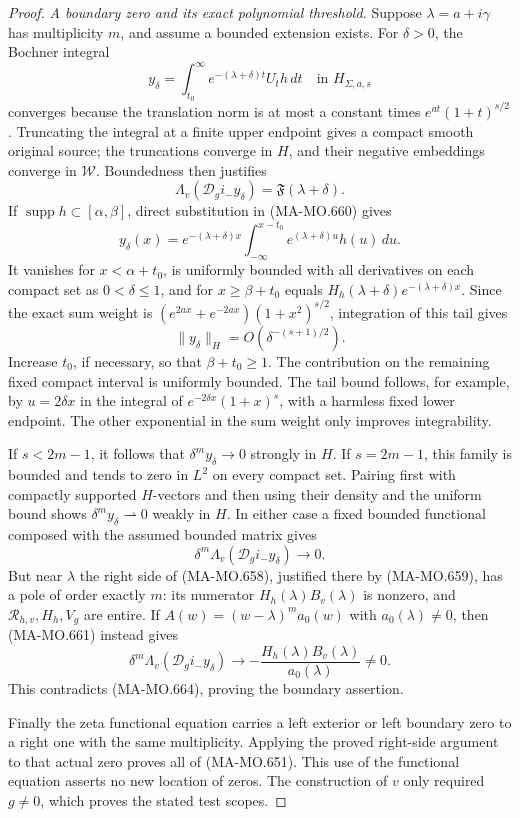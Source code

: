 \begin{proof}
\emph{A boundary zero and its exact polynomial threshold.}
Suppose \(\lambda=a+i\gamma\) has multiplicity \(m\), and
assume a bounded extension exists. For \(\delta>0\), the
Bochner integral
\[
 y_\delta=\int_{t_0}^{\infty}
                   e^{-(\lambda+\delta)t}U_th\,dt
                    \quad\text{in }H_{\Sigma,a,s}
 \tag{MA-MO.660}
\]
converges because the translation norm is at most a constant
times \(e^{at}(1+t)^{s/2}\). Truncating the integral at a
finite upper endpoint gives a compact smooth original source;
the truncations converge in \(H\), and their negative embeddings
converge in \(\mathcal W\). Boundedness then justifies
\[
 \Lambda_v(\mathscr D_g i_-y_\delta)
                        =\mathfrak F(\lambda+\delta).
 \tag{MA-MO.661}
\]
If \(\operatorname{supp}h\subset[\alpha,\beta]\), direct
substitution in (MA-MO.660) gives
\[
 y_\delta(x)=e^{-(\lambda+\delta)x}
       \int_{-\infty}^{x-t_0}e^{(\lambda+\delta)u}h(u)\,du.
 \tag{MA-MO.662}
\]
It vanishes for \(x<\alpha+t_0\), is uniformly bounded with
all derivatives on each compact set as \(0<\delta\leq1\),
and for \(x\geq\beta+t_0\) equals
\(H_h(\lambda+\delta)e^{-(\lambda+\delta)x}\).
Since the exact sum weight is
\((e^{2ax}+e^{-2ax})(1+x^2)^{s/2}\), integration of this
tail gives
\[
                  \|y_\delta\|_H
                         =O(\delta^{-(s+1)/2}).
 \tag{MA-MO.663}
\]
Increase \(t_0\), if necessary, so that \(\beta+t_0\geq1\).
The contribution on the remaining fixed compact interval is
uniformly bounded. The tail bound follows, for example, by
\(u=2\delta x\) in the integral of
\(e^{-2\delta x}(1+x)^s\), with a harmless fixed lower
endpoint. The other exponential in the sum weight only improves
integrability.

If \(s<2m-1\), it follows that \(\delta^m y_\delta\to0\)
strongly in \(H\). If \(s=2m-1\), this family is bounded
and tends to zero in \(L^2\) on every compact set. Pairing
first with compactly supported \(H\)-vectors and then using
their density and the uniform bound shows
\(\delta^m y_\delta\rightharpoonup0\) weakly in \(H\).
In either case a fixed bounded functional composed with the
assumed bounded matrix gives
\[
       \delta^m\Lambda_v(\mathscr D_g i_-y_\delta)\longrightarrow0.
 \tag{MA-MO.664}
\]
But near \(\lambda\) the right side of (MA-MO.658), justified
there by (MA-MO.659), has a pole of order exactly \(m\): its
numerator \(H_h(\lambda)B_v(\lambda)\) is nonzero, and
\(\mathcal R_{h,v},H_h,V_g\) are entire. If
\(A(w)=(w-\lambda)^m a_0(w)\) with \(a_0(\lambda)\ne0\),
then (MA-MO.661) instead gives
\[
 \delta^m\Lambda_v(\mathscr D_g i_-y_\delta)
       \longrightarrow
       -\frac{H_h(\lambda)B_v(\lambda)}{a_0(\lambda)}\ne0.
 \tag{MA-MO.665}
\]
This contradicts (MA-MO.664), proving the boundary assertion.

Finally the zeta functional equation carries a left exterior
or left boundary zero to a right one with the same multiplicity.
Applying the proved right-side argument to that actual zero
proves all of (MA-MO.651). This use of the functional equation
asserts no new location of zeros. The construction of \(v\)
only required \(g\ne0\), which proves the stated test scopes.
\end{proof}

